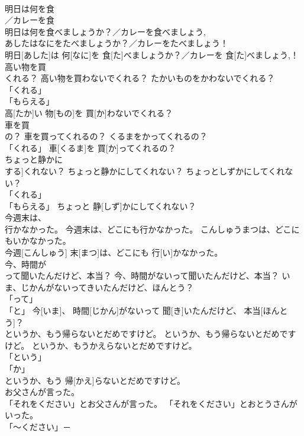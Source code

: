 \documentclass[8pt]{extreport}
\begin{document}
\begin{CJK}{UTF8}{min}
\\	明日は何を食
\\	／カレーを食
\\	明日は何を食べましょうか？／カレーを食べましょう, 
\\	あしたはなにをたべましょうか？／カレーをたべましょう！	
\\	明日[あした]は 何[なに]を 食[た]べましょうか？／カレーを 食[た]べましょう,！		
\\	高い物を買
\\	くれる？	高い物を買わないでくれる？	たかいものをかわないでくれる？	
\\	「くれる」 
\\	「もらえる」 
\\	高[たか]い 物[もの]を 買[か]わないでくれる？		
\\	車を買
\\	の？	車を買ってくれるの？	くるまをかってくれるの？	
\\	「くれる」	車[くるま]を 買[か]ってくれるの？		
\\	ちょっと静かに
\\	する]くれない？	ちょっと静かにしてくれない？	ちょっとしずかにしてくれない？	
\\	「くれる」 
\\	「もらえる」	ちょっと 静[しず]かにしてくれない？		
\\	今週末は、
\\	行かなかった。	今週末は、どこにも行かなかった。	こんしゅうまつは、どこにもいかなかった。	
\\	今週[こんしゅう] 末[まつ]は、どこにも 行[い]かなかった。		
\\	今、時間が
\\	って聞いたんだけど、本当？	今、時間がないって聞いたんだけど、本当？	いま、じかんがないってきいたんだけど、ほんとう？	
\\	「って」 
\\	「と」	今[いま]、 時間[じかん]がないって 聞[き]いたんだけど、 本当[ほんとう]？		
\\	というか、もう帰らないとだめですけど。	というか、もう帰らないとだめですけど。	というか、もうかえらないとだめですけど。	
\\	「という」 
\\	「か」 
\\	というか、もう 帰[かえ]らないとだめですけど。		
\\	お父さんが言った。
\\	「それをください」とお父さんが言った。	「それをください」とおとうさんがいった。	
\\	「～ください」－ 

\end{CJK}
\end{document}
